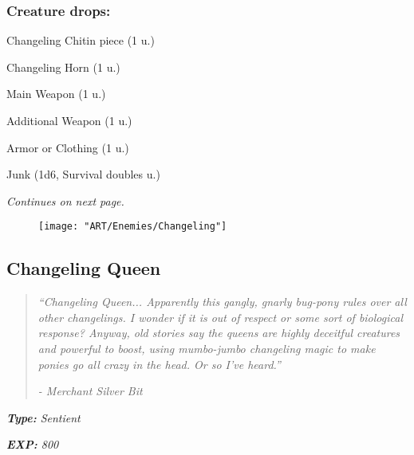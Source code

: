 \documentclass[11pt,a4paper,twocolumn]{book}
\begin{document}
	\vfill
	\subsubsection*{Creature drops:}
	\begin{compactitem}
		\item Changeling Chitin piece (1 u.)
		\item Changeling Horn (1 u.)
		\item Main Weapon (1 u.)
		\item Additional Weapon (1 u.)
		\item Armor or Clothing (1 u.)
		\item Junk (1d6, Survival doubles u.)
	\end{compactitem}
	
	\bigskip
	\emph{Continues on next page.}
	
	\begin{figure}[h]
		\centering
		\texttt{[image: "ART/Enemies/Changeling"]}
	\end{figure}
	
	\clearpage
	\subsection*{Changeling Queen}
	\begin{quote}
		\emph{``Changeling Queen... Apparently this gangly, gnarly bug-pony rules over all other changelings. I wonder if it is out of respect or some sort of biological response? Anyway, old stories say the queens are highly deceitful creatures and powerful to boost, using mumbo-jumbo changeling magic to make ponies go all crazy in the head. Or so I've heard.''}
		
		\emph{-	Merchant Silver Bit}
	\end{quote}
	
	\noindent
	\emph{\textbf{Type:} Sentient}
	
	\noindent
	\emph{\textbf{EXP:} 800}
	
\end{document}

